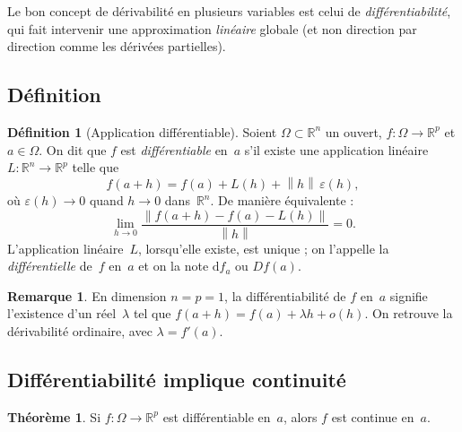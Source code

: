 \documentclass[12pt,a4paper,openany]{book}
\theoremstyle{definition}
\newtheorem{definition}{Définition}[chapter]
\newtheorem{theoreme}{Théorème}[chapter]
\newtheorem{remarque}{Remarque}[chapter]
\newcommand{\R}{\mathbb{R}}
\newcommand{\eps}{\varepsilon}
\newcommand{\norm}[1]{\left\lVert #1 \right\rVert}
\newcommand{\dd}{\mathrm{d}}
\begin{document}
Le bon concept de dérivabilité en plusieurs variables est celui de \emph{différentiabilité}, qui fait intervenir une approximation \emph{linéaire} globale (et non direction par direction comme les dérivées partielles).

\subsection{Définition}

\begin{tcolorbox}[
  enhanced,
  colback=red!5!white,
  colframe=red!70!black,
  fonttitle=\bfseries\large,
  title={Définition centrale : Différentiabilité},
  breakable,
  before skip=12pt,
  after skip=12pt,
  left=10pt, right=10pt, top=8pt, bottom=8pt
]
\begin{definition}[Application différentiable]\label{def:differentiable}
  Soient $\Omega \subset \R^n$ un ouvert, $f \colon \Omega \to \R^p$ et $a \in \Omega$. On dit que $f$ est \emph{différentiable} en~$a$ s'il existe une application linéaire $L \colon \R^n \to \R^p$ telle que
  \[
    f(a + h) = f(a) + L(h) + \norm{h} \, \eps(h),
  \]
  où $\eps(h) \to 0$ quand $h \to 0$ dans~$\R^n$. De manière équivalente :
  \[
    \lim_{h \to 0} \frac{\norm{f(a+h) - f(a) - L(h)}}{\norm{h}} = 0.
  \]
  L'application linéaire~$L$, lorsqu'elle existe, est unique ; on l'appelle la \emph{différentielle} de~$f$ en~$a$ et on la note $\dd f_a$ ou $Df(a)$.
\end{definition}
\end{tcolorbox}

\begin{remarque}
  \label{rem:diff-dim-1}
  En dimension $n = p = 1$, la différentiabilité de $f$ en~$a$ signifie l'existence d'un réel~$\lambda$ tel que $f(a+h) = f(a) + \lambda h + o(h)$. On retrouve la dérivabilité ordinaire, avec $\lambda = f'(a)$.
\end{remarque}

\subsection{Différentiabilité implique continuité}

\begin{theoreme}
  \label{thm:diff-implique-cont}
  Si $f \colon \Omega \to \R^p$ est différentiable en~$a$, alors $f$ est continue en~$a$.
\end{theoreme}
\end{document}
